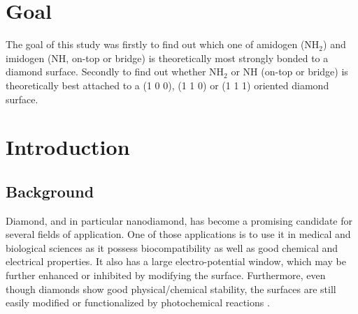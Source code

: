 \documentclass[12pt,a4paper]{article}
\begin{document}
\newpage
\tableofcontents
\newpage

\section{Goal}
The goal of this study was firstly to find out which one of amidogen (NH$_2$) and imidogen (NH, on-top or bridge) is theoretically most strongly bonded to a diamond surface. Secondly to find out whether NH$_2$ or NH (on-top or bridge) is theoretically best attached to a (1 0 0), (1 1 0) or (1 1 1) oriented diamond surface.

\section{Introduction}
\subsection{Background}
Diamond, and in particular nanodiamond, has become a promising candidate for several fields of application. One of those applications is to use it in medical and biological sciences as it possess biocompatibility  as well as good chemical and electrical properties. It also has a large electro-potential window, which may be further enhanced or inhibited by modifying the surface. Furthermore, even though diamonds show good physical/chemical stability, the surfaces are still easily modified or functionalized by photochemical reactions \cite{c.e.nebel2007}.
\end{document}
